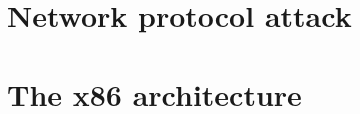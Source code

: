 \documentclass[12pt, a4paper]{report}
\begin{document}
    \chapter{Network protocol attack}
    
    
    
    
    
    \appendix
    \chapter{The x86 architecture}
    
    
     
     
\end{document}
